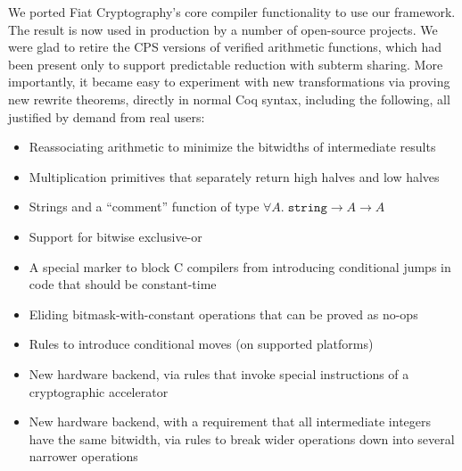 \documentclass[a4paper,USenglish,cleveref,autoref,thm-restate]{lipics-v2021}
\begin{document}
We ported Fiat Cryptography's core compiler functionality to use our framework.
The result is now used in production by a number of open-source projects.
We were glad to retire the CPS versions of verified arithmetic functions, which had been present only to support predictable reduction with subterm sharing.
More importantly, it became easy to experiment with new transformations via proving new rewrite theorems, directly in normal Coq syntax, including the following, all justified by demand from real users:
\begin{itemize}
\item Reassociating arithmetic to minimize the bitwidths of intermediate results
\item Multiplication primitives that separately return high halves and low halves
\item Strings and a ``comment'' function of type $\forall A. \; \texttt{string} \to A \to A$
\item Support for bitwise exclusive-or
\item A special marker to block C compilers from introducing conditional jumps in code that should be constant-time
\item Eliding bitmask-with-constant operations that can be proved as no-ops
\item Rules to introduce conditional moves (on supported platforms)
\item New hardware backend, via rules that invoke special instructions of a cryptographic accelerator
\item New hardware backend, with a requirement that all intermediate integers have the same bitwidth, via rules to break wider operations down into several narrower operations
\end{itemize}

\end{document}
